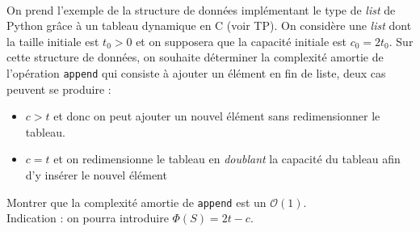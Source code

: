 \documentclass[11pt,a4paper]{article}
\begin{document}
\begin{Exercise}[title={Un exemple de complexité amortie}]\\
On prend l'exemple de la structure de données implémentant le type de \textit{list} de Python grâce à un tableau dynamique en C (voir TP). On considère une \textit{list} dont la taille initiale est $t_0>0$ et on supposera que la capacité initiale est $c_0=2t_0$. Sur cette structure de données, on souhaite déterminer la complexité amortie de l'opération {\tt append} qui consiste à ajouter un élément en fin de liste, deux cas peuvent se produire :
\begin{itemize}
\item[\textbullet] $c>t$ et donc on peut ajouter un nouvel élément sans redimensionner le tableau.
\item[\textbullet] $c=t$ et on redimensionne le tableau en \textit{doublant} la capacité du tableau afin d'y insérer le nouvel élément
\end{itemize}
Montrer que la complexité amortie de {\tt append} est un $\mathcal{O}(1)$. \\
{\small \aide \;} Indication : on pourra introduire $\Phi(S) = 2t -c$.
\end{Exercise}
\end{document}
